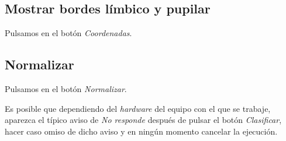 \subsection{Mostrar bordes límbico y pupilar}
Pulsamos en el botón \emph{Coordenadas}.

\subsection{Normalizar}
Pulsamos en el botón \emph{Normalizar}.

Es posible que dependiendo del \emph{hardware} del equipo con el que se trabaje, aparezca el típico aviso de \emph{No responde} después de pulsar el botón \emph{Clasificar}, hacer caso omiso de dicho aviso y en ningún momento cancelar la ejecución.